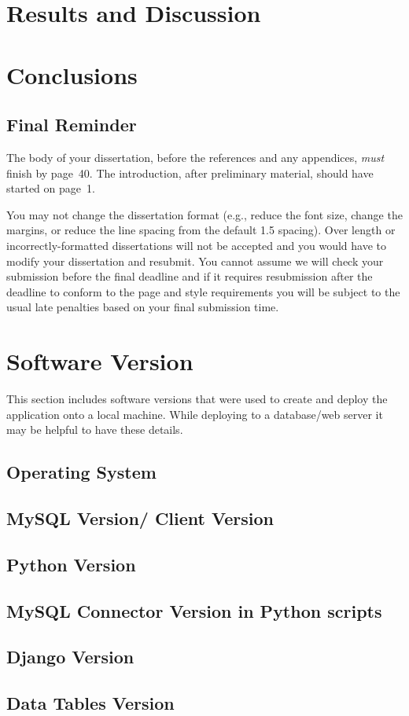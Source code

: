 \documentclass[msc,deptreport,ai]{infthesis}      %
\begin{document}
\chapter{Results and Discussion}

\chapter{Conclusions}

\section{Final Reminder}

The body of your dissertation, before the references and any appendices,
\emph{must} finish by page~40. The introduction, after preliminary material,
should have started on page~1.

You may not change the dissertation format (e.g., reduce the font
size, change the margins, or reduce the line spacing from the default
1.5 spacing). Over length or incorrectly-formatted dissertations will
not be accepted and you would have to modify your dissertation and
resubmit.  You cannot assume we will check your submission before the
final deadline and if it requires resubmission after the deadline to
conform to the page and style requirements you will be subject to the
usual late penalties based on your final submission time.





 \appendix
% 
\chapter{Software Version}
% 
This section includes software versions that were used to create and deploy the application onto a local machine. While deploying to a database/web server it may be helpful to have these details.
 \section{Operating System}
 \section{MySQL Version/ Client Version}
 \section{Python Version}
 \section{MySQL Connector Version in Python scripts}
 \section{Django Version}
 \section{Data Tables Version}
\end{document}
